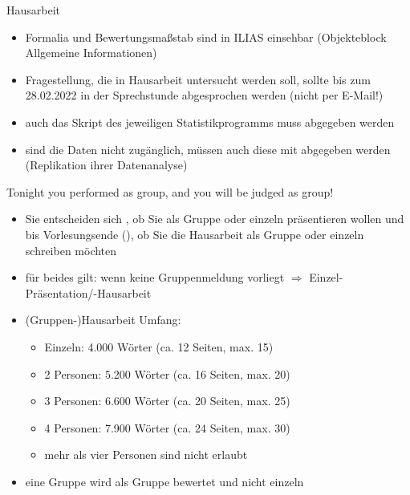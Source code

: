 \documentclass[11pt]{beamer}
\begin{document}
\begin{frame}[t]{Hausarbeit}
	\begin{itemize}
		\item Formalia und Bewertungsmaßstab sind in ILIAS einsehbar (Objekteblock Allgemeine Informationen)
		\item Fragestellung, die in Hausarbeit untersucht werden soll, sollte bis zum 28.02.2022 in der Sprechstunde abgesprochen werden (nicht per E-Mail!)
		\item auch das Skript des jeweiligen Statistikprogramms muss abgegeben werden 
		\item sind die Daten nicht zugänglich, müssen auch diese mit abgegeben werden (Replikation ihrer Datenanalyse)
	\end{itemize}
\end{frame}

\begin{frame}[t]{Tonight you performed as group, and you will be judged as group!}
	\begin{itemize}
		\item Sie entscheiden sich , ob Sie als Gruppe oder einzeln präsentieren wollen und bis Vorlesungsende (), ob Sie die Hausarbeit als Gruppe oder einzeln schreiben möchten
		\pause
		\item für beides gilt: wenn keine Gruppenmeldung vorliegt $\Rightarrow$ Einzel-Präsentation/-Hausarbeit
		\pause
		\item (Gruppen-)Hausarbeit Umfang:
		\pause
			\begin{itemize}
				\item Einzeln: 4.000 Wörter (ca. 12 Seiten, max. 15)
				\item 2 Personen: 5.200 Wörter (ca. 16 Seiten, max. 20)
				\item 3 Personen: 6.600 Wörter (ca. 20 Seiten, max. 25)
				\item 4 Personen: 7.900 Wörter (ca. 24 Seiten, max. 30)
				\item mehr als vier Personen sind nicht erlaubt 
			\end{itemize}
		\pause
		\item eine Gruppe wird als Gruppe bewertet und nicht einzeln
	\end{itemize}
\end{frame}
\end{document}
